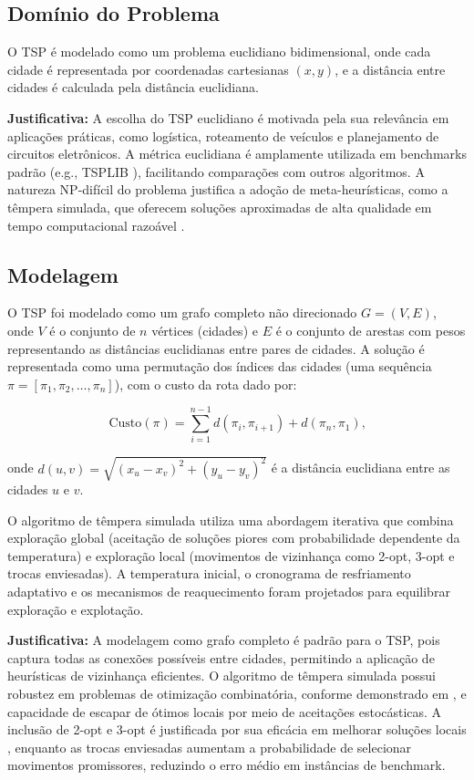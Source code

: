 \documentclass[11pt]{article}
\begin{document}
\subsection{Domínio do Problema}
O TSP é modelado como um problema euclidiano bidimensional, onde cada cidade é representada por coordenadas cartesianas \((x, y)\), e a distância entre cidades é calculada pela distância euclidiana. 

\textbf{Justificativa:} A escolha do TSP euclidiano é motivada pela sua relevância em aplicações práticas, como logística, roteamento de veículos e planejamento de circuitos eletrônicos. A métrica euclidiana é amplamente utilizada em benchmarks padrão (e.g., TSPLIB \cite{reinelt1991tsplib}), facilitando comparações com outros algoritmos. A natureza NP-difícil do problema justifica a adoção de meta-heurísticas, como a têmpera simulada, que oferecem soluções aproximadas de alta qualidade em tempo computacional razoável \cite{kirkpatrick1983optimization}.

\subsection{Modelagem}
O TSP foi modelado como um grafo completo não direcionado \(G = (V, E)\), onde \(V\) é o conjunto de \(n\) vértices (cidades) e \(E\) é o conjunto de arestas com pesos representando as distâncias euclidianas entre pares de cidades. A solução é representada como uma permutação dos índices das cidades (uma sequência \(\pi = [\pi_1, \pi_2, \ldots, \pi_n]\)), com o custo da rota dado por:

\[
    \text{Custo}(\pi) = \sum_{i=1}^{n-1} d\left(\pi_i, \pi_{i+1}\right) + d\left(\pi_n, \pi_1\right)\text{,}
\]

onde \(d\left(u, v\right) = \sqrt{\left(x_u - x_v\right)^2 + \left(y_u - y_v\right)^2}\) é a distância euclidiana entre as cidades \(u\) e \(v\).

O algoritmo de têmpera simulada utiliza uma abordagem iterativa que combina exploração global (aceitação de soluções piores com probabilidade dependente da temperatura) e exploração local (movimentos de vizinhança como 2-opt, 3-opt e trocas enviesadas). A temperatura inicial, o cronograma de resfriamento adaptativo e os mecanismos de reaquecimento foram projetados para equilibrar exploração e explotação.

\textbf{Justificativa:} A modelagem como grafo completo é padrão para o TSP, pois captura todas as conexões possíveis entre cidades, permitindo a aplicação de heurísticas de vizinhança eficientes. O algoritmo de têmpera simulada possui robustez em problemas de otimização combinatória, conforme demonstrado em \cite{cerny1985thermodynamical}, e capacidade de escapar de ótimos locais por meio de aceitações estocásticas. A inclusão de 2-opt e 3-opt é justificada por sua eficácia em melhorar soluções locais \cite{lin1973effective}, enquanto as trocas enviesadas aumentam a probabilidade de selecionar movimentos promissores, reduzindo o erro médio em instâncias de benchmark.
\end{document}
